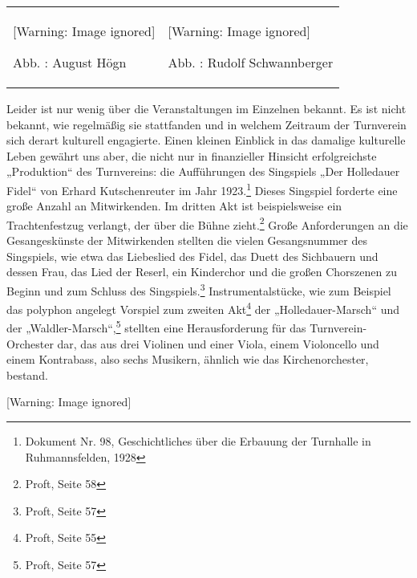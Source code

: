 \documentclass[a4paper]{article}
\newcounter{Abb}
\renewcommand\theAbb{\arabic{Abb}}
\begin{document}
\begin{center}
\begin{minipage}{6.682cm}
\begin{flushleft}
\tablefirsthead{}
\tablehead{}
\tabletail{}
\tablelasttail{}
\begin{supertabular}{m{3.1069999cm}m{3.174cm}}
  [Warning: Image ignored] %
 
Abb. \stepcounter{Abb}{\theAbb}: August Högn &
  [Warning: Image ignored] %
 
Abb. \stepcounter{Abb}{\theAbb}: Rudolf Schwannberger\\
\end{supertabular}
\end{flushleft}
\end{minipage}
\end{center}
Leider ist nur wenig über die Veranstaltungen im Einzelnen bekannt. Es
ist nicht bekannt, wie regelmäßig sie stattfanden und in welchem
Zeitraum der Turnverein sich derart kulturell engagierte. Einen kleinen
Einblick in das damalige kulturelle Leben gewährt uns aber, die nicht
nur in finanzieller Hinsicht erfolgreichste „Produktion“ des
Turnvereins: die Aufführungen des Singspiels „Der Holledauer Fidel“ von
Erhard Kutschenreuter im Jahr 1923.\footnote{ Dokument Nr. 98,
Geschichtliches über die Erbauung der Turnhalle in Ruhmannsfelden,
1928} Dieses Singspiel forderte eine große Anzahl an Mitwirkenden. Im
dritten Akt ist beispielsweise ein Trachtenfestzug verlangt, der über
die Bühne zieht.\footnote{ Proft, Seite 58} Große Anforderungen an die
Gesangeskünste der Mitwirkenden stellten die vielen Gesangsnummer des
Singspiels, wie etwa das Liebeslied des Fidel, das Duett des Sichbauern
und dessen Frau, das Lied der Reserl, ein Kinderchor und die großen
Chorszenen zu Beginn und zum Schluss des Singspiels.\footnote{ Proft,
Seite 57} Instrumentalstücke, wie zum Beispiel das polyphon angelegt
Vorspiel zum zweiten Akt\footnote{ Proft, Seite 55} der
„Holledauer-Marsch“ und der „Waldler-Marsch“,\footnote{ Proft, Seite
57} stellten eine Herausforderung für das Turnverein-Orchester dar, das
aus drei Violinen und einer Viola, einem Violoncello und einem
Kontrabass, also sechs Musikern, ähnlich wie das Kirchenorchester,
bestand. 

  [Warning: Image ignored] %
 
\end{document}
